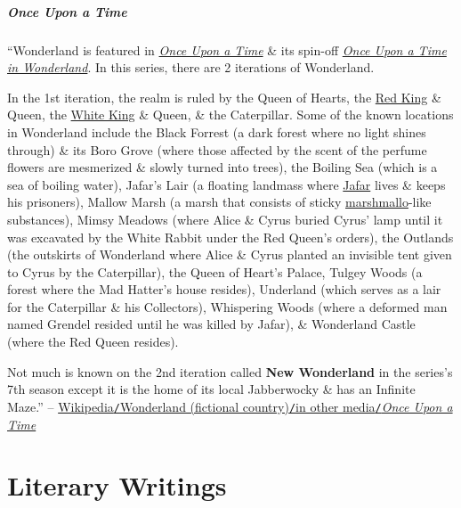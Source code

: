 \documentclass[oneside]{book}
\numberwithin{equation}{section}
\begin{document}
\subsubsection{\textit{Once Upon a Time}}
``Wonderland is featured in \href{https://en.wikipedia.org/wiki/Once_Upon_a_Time_(TV_series)}{\textit{Once Upon a Time}} \& its spin-off \href{https://en.wikipedia.org/wiki/Once_Upon_a_Time_in_Wonderland}{\textit{Once Upon a Time in Wonderland}}. In this series, there are 2 iterations of Wonderland.

In the 1st iteration, the realm is ruled by the Queen of Hearts, the \href{https://en.wikipedia.org/wiki/Red_King_(Through_the_Looking-Glass)}{Red King} \& Queen, the \href{https://en.wikipedia.org/wiki/White_King_(Through_the_Looking-Glass)}{White King} \& Queen, \& the Caterpillar. Some of the known locations in Wonderland include the Black Forrest (a dark forest where no light shines through) \& its Boro Grove (where those affected by the scent of the perfume flowers are mesmerized \& slowly turned into trees), the Boiling Sea (which is a sea of boiling water), Jafar's Lair (a floating landmass where \href{https://en.wikipedia.org/wiki/Jafar_(Disney)}{Jafar} lives \& keeps his prisoners), Mallow Marsh (a marsh that consists of sticky \href{https://en.wikipedia.org/wiki/Marshmallow}{marshmallo}-like substances), Mimsy Meadows (where Alice \& Cyrus buried Cyrus' lamp until it was excavated by the White Rabbit under the Red Queen's orders), the Outlands (the outskirts of Wonderland where Alice \& Cyrus planted an invisible tent given to Cyrus by the Caterpillar), the Queen of Heart's Palace, Tulgey Woods (a forest where the Mad Hatter's house resides), Underland (which serves as a lair for the Caterpillar \& his Collectors), Whispering Woods (where a deformed man named Grendel resided until he was killed by Jafar), \& Wonderland Castle (where the Red Queen resides).

Not much is known on the 2nd iteration called \textbf{New Wonderland} in the series's 7th season except it is the home of its local Jabberwocky \& has an Infinite Maze.'' -- \href{https://en.wikipedia.org/wiki/Wonderland_(fictional_country)#Once_Upon_a_Time}{Wikipedia\texttt{/}Wonderland (fictional country)\texttt{/}in other media\texttt{/}\textit{Once Upon a Time}}


\part{Literary Writings}
\end{document}
